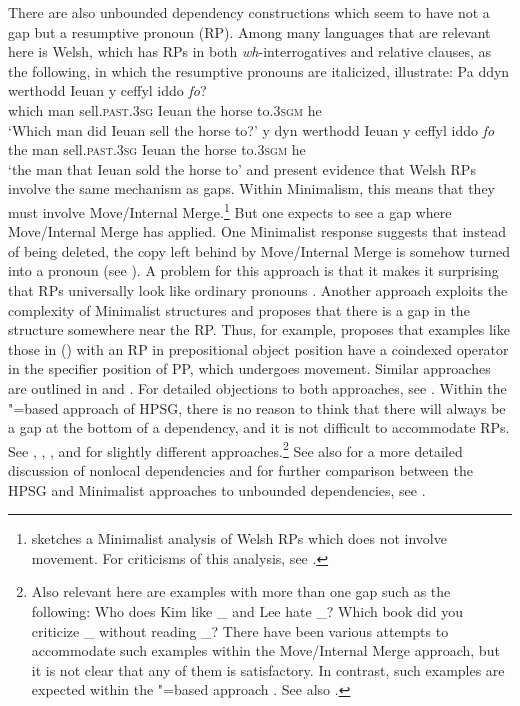 \documentclass[output=paper
                ,modfonts
                ,nonflat
	        ,collection
	        ,collectionchapter
	        ,collectiontoclongg
 	        ,biblatex
                ,babelshorthands
                ,newtxmath
                ,draftmode
                ,colorlinks, citecolor=brown
]{./langsci/langscibook}
\begin{document}
There are also unbounded dependency constructions which seem to have not a gap but a resumptive pronoun (RP). Among many languages that are relevant here is Welsh, which has RPs in both \emph{wh}-interrogatives and relative clauses, as the following, in which the resumptive pronouns are italicized, illustrate:
\eal
\ex
\gll Pa	ddyn werthodd Ieuan y ceffyl iddo \emph{fo}?\\
     which man sell.\textsc{past}.\textsc{3sg} Ieuan the horse to.\textsc{3sgm} he\\
\glt`Which man did Ieuan sell the horse to?'
\ex 
\gll y dyn werthodd Ieuan y ceffyl iddo \emph{fo}\\
the man sell.\textsc{past}.\textsc{3sg} Ieuan the horse to.\textsc{3sgm} he\\
\glt`the man that Ieuan sold the horse to'
\zl
\citet{Willis.2011} and \citet{Borsley.2010,Borsley2013a-u} present evidence that Welsh RPs involve
the same mechanism as gaps. Within Minimalism, this means that they must involve Move/Internal
Merge.\footnote{%
  \citet{Rouveret2008a-u} sketches a Minimalist analysis of Welsh RPs which does not involve movement. For
  criticisms of this analysis, see .
} But one expects to see a gap where Move/Internal Merge has applied. One Minimalist response
suggests that instead of being deleted, the copy left behind by Move/Internal Merge is somehow
turned into a pronoun (see \citealt{McCloskey.2006}). A problem for this approach is that it makes
it surprising that RPs universally look like ordinary pronouns \citep{McCloskey2002a-u}.
Another approach exploits the complexity of
Minimalist structures and proposes that there is a gap in the structure somewhere near the RP.
Thus, for example, \citet{Willis.2011} proposes that examples like those in () with an RP in
prepositional object position have a coindexed operator in the specifier position of PP, which
undergoes movement. Similar approaches are outlined in \citet{AounChoueiriHornstein2001a-u} and
\citet{Boeckx.2003}. For detailed objections to both approaches, see
\citet[Section~3]{Borsley2013a-u}. Within the \slasch"=based approach of HPSG, there is no reason to
think that there will always be a gap at the bottom of a dependency, and it is not difficult to
accommodate RPs. See \citet{Vaillette2001b}, \citet{Taghvaipour2010a-u}, \citet{Borsley2013a-u}, and \citet{crysmann_b10fg,Crysmann2016a-u} for slightly
different approaches.\footnote{%
	Also relevant here are examples with more than one gap such as the following:
	\eal
	\ex	Who does Kim like \_ and Lee hate \_?
	\ex	Which book did you criticize \_ without reading \_?
	\zl
	There have been various attempts to accommodate such examples within the Move/Internal Merge
        approach, but it is not clear that any of them is satisfactory. In contrast, such examples
        are expected within the \slasch"=based approach \citep{LS2003a-u}. See also \citet[Section~4.6]{ps2}.%
}
See also  for a more detailed discussion of nonlocal dependencies and for
further comparison between the HPSG and Minimalist approaches to unbounded dependencies, see
.
\end{document}
